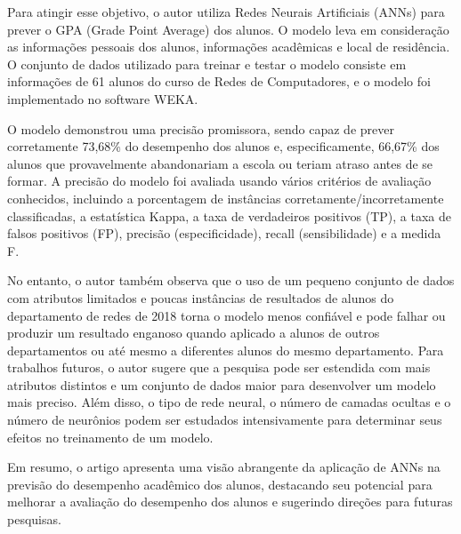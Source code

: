 \documentclass[conference]{IEEEtran}
\begin{document}
Para atingir esse objetivo, o autor utiliza Redes Neurais Artificiais (ANNs) para prever o GPA (Grade Point Average) dos alunos. O modelo leva em consideração as informações pessoais dos alunos, informações acadêmicas e local de residência. O conjunto de dados utilizado para treinar e testar o modelo consiste em informações de 61 alunos do curso de Redes de Computadores, e o modelo foi implementado no software WEKA.

O modelo demonstrou uma precisão promissora, sendo capaz de prever corretamente 73,68\% do desempenho dos alunos e, especificamente, 66,67\% dos alunos que provavelmente abandonariam a escola ou teriam atraso antes de se formar. A precisão do modelo foi avaliada usando vários critérios de avaliação conhecidos, incluindo a porcentagem de instâncias corretamente/incorretamente classificadas, a estatística Kappa, a taxa de verdadeiros positivos (TP), a taxa de falsos positivos (FP), precisão (especificidade), recall (sensibilidade) e a medida F.

No entanto, o autor também observa que o uso de um pequeno conjunto de dados com atributos limitados e poucas instâncias de resultados de alunos do departamento de redes de 2018 torna o modelo menos confiável e pode falhar ou produzir um resultado enganoso quando aplicado a alunos de outros departamentos ou até mesmo a diferentes alunos do mesmo departamento. Para trabalhos futuros, o autor sugere que a pesquisa pode ser estendida com mais atributos distintos e um conjunto de dados maior para desenvolver um modelo mais preciso. Além disso, o tipo de rede neural, o número de camadas ocultas e o número de neurônios podem ser estudados intensivamente para determinar seus efeitos no treinamento de um modelo.

Em resumo, o artigo apresenta uma visão abrangente da aplicação de ANNs na previsão do desempenho acadêmico dos alunos, destacando seu potencial para melhorar a avaliação do desempenho dos alunos e sugerindo direções para futuras pesquisas.
\end{document}
